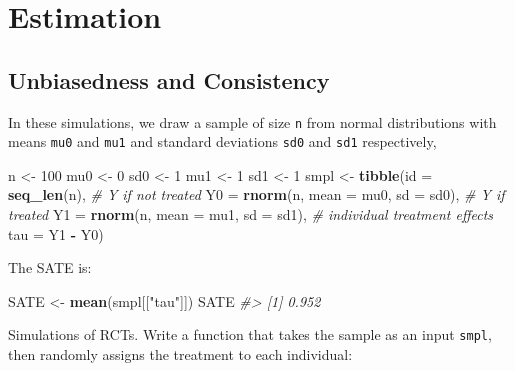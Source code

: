 \documentclass[]{book}
\newenvironment{Shaded}{\begin{snugshade}}{\end{snugshade}}
\newcommand{\CommentTok}[1]{\textcolor[rgb]{0.56,0.35,0.01}{\textit{#1}}}
\newcommand{\DataTypeTok}[1]{\textcolor[rgb]{0.13,0.29,0.53}{#1}}
\newcommand{\DecValTok}[1]{\textcolor[rgb]{0.00,0.00,0.81}{#1}}
\newcommand{\KeywordTok}[1]{\textcolor[rgb]{0.13,0.29,0.53}{\textbf{#1}}}
\newcommand{\NormalTok}[1]{#1}
\newcommand{\OperatorTok}[1]{\textcolor[rgb]{0.81,0.36,0.00}{\textbf{#1}}}
\newcommand{\StringTok}[1]{\textcolor[rgb]{0.31,0.60,0.02}{#1}}
\theoremstyle{definition}
\theoremstyle{definition}
\theoremstyle{definition}
\theoremstyle{remark}
\begin{document}
\hypertarget{estimation}{%
\section{Estimation}\label{estimation}}

\hypertarget{unbiasedness-and-consistency}{%
\subsection{Unbiasedness and
Consistency}\label{unbiasedness-and-consistency}}

In these simulations, we draw a sample of size \texttt{n} from normal
distributions with means \texttt{mu0} and \texttt{mu1} and standard
deviations \texttt{sd0} and \texttt{sd1} respectively,

\begin{Shaded}
\begin{Highlighting}[]
\NormalTok{n <-}\StringTok{ }\DecValTok{100}
\NormalTok{mu0 <-}\StringTok{ }\DecValTok{0}
\NormalTok{sd0 <-}\StringTok{ }\DecValTok{1}
\NormalTok{mu1 <-}\StringTok{ }\DecValTok{1}
\NormalTok{sd1 <-}\StringTok{ }\DecValTok{1}
\NormalTok{smpl <-}\StringTok{ }\KeywordTok{tibble}\NormalTok{(}\DataTypeTok{id =} \KeywordTok{seq_len}\NormalTok{(n),}
               \CommentTok{# Y if not treated}
               \DataTypeTok{Y0 =} \KeywordTok{rnorm}\NormalTok{(n, }\DataTypeTok{mean =}\NormalTok{ mu0, }\DataTypeTok{sd =}\NormalTok{ sd0),}
               \CommentTok{# Y if treated}
               \DataTypeTok{Y1 =} \KeywordTok{rnorm}\NormalTok{(n, }\DataTypeTok{mean =}\NormalTok{ mu1, }\DataTypeTok{sd =}\NormalTok{ sd1),}
               \CommentTok{# individual treatment effects}
               \DataTypeTok{tau =}\NormalTok{ Y1 }\OperatorTok{-}\StringTok{ }\NormalTok{Y0)}
\end{Highlighting}
\end{Shaded}

The SATE is:

\begin{Shaded}
\begin{Highlighting}[]
\NormalTok{SATE <-}\StringTok{ }\KeywordTok{mean}\NormalTok{(smpl[[}\StringTok{"tau"}\NormalTok{]])}
\NormalTok{SATE}
\CommentTok{#> [1] 0.952}
\end{Highlighting}
\end{Shaded}

Simulations of RCTs. Write a function that takes the sample as an input
\texttt{smpl}, then randomly assigns the treatment to each individual:
\end{document}
